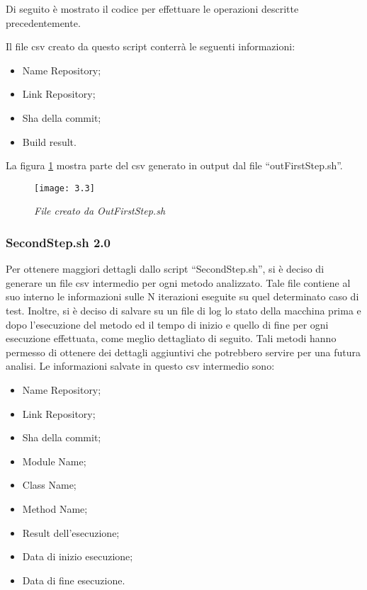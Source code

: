 Di seguito è mostrato il codice per effettuare le operazioni descritte precedentemente.


Il file csv creato da questo script conterrà le seguenti informazioni:
\begin{itemize}
	\item Name Repository;
	\item Link Repository;
	\item Sha della commit;
	\item Build result.
\end{itemize}

La figura \ref{fig:outFirstStep} mostra parte del csv generato in output dal file “outFirstStep.sh”.
\newpage
\begin{figure}[h]
	\centering
	\texttt{[image: 3.3]}
	\caption{\emph{File creato da OutFirstStep.sh}}
	\label{fig:outFirstStep}
\end{figure}
\subsubsection{SecondStep.sh 2.0}
Per ottenere maggiori dettagli dallo script “SecondStep.sh”, si è deciso di generare un file csv intermedio per ogni metodo analizzato. Tale file contiene al suo interno le informazioni sulle N iterazioni eseguite su quel determinato caso di test. Inoltre, si è deciso di salvare su un file di log lo stato della macchina prima e
dopo l’esecuzione del metodo ed il tempo di inizio e quello di fine per ogni esecuzione effettuata, come meglio dettagliato di seguito. Tali metodi hanno permesso di ottenere dei dettagli aggiuntivi che potrebbero servire per una futura analisi. Le informazioni salvate in questo csv intermedio sono:
\begin{itemize}
	\item Name Repository;
	\item Link Repository;
	\item Sha della commit;
	\item Module Name;
	\item Class Name;
	\item Method Name;
	\item Result dell’esecuzione;
	\item Data di inizio esecuzione;
	\item Data di fine esecuzione.
\end{itemize}

